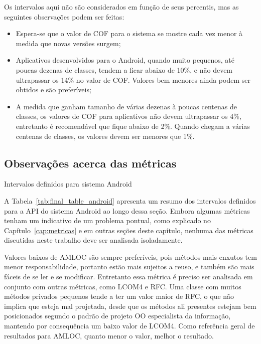 Os intervalos aqui não são considerados em função de seus percentis, mas as seguintes observações podem ser feitas:

\begin{itemize}
\item Espera-se que o valor de COF para o sistema se mostre cada vez menor à medida que novas versões surgem;
\item Aplicativos desenvolvidos para o Android, quando muito pequenos, até poucas dezenas de classes, tendem a ficar abaixo de 10\%, e não devem ultrapassar os 14\% no valor de COF. Valores bem menores ainda podem ser obtidos e são preferíveis;
\item A medida que ganham tamanho de várias dezenas à poucas centenas de classes, os valores de COF para aplicativos não devem ultrapassar os 4\%, entretanto é recomendável que fique abaixo de 2\%. Quando chegam a várias centenas de classes, os valores devem ser menores que 1\%.
\end{itemize}

\subsection{Observações acerca das métricas}

\begin{table}[!htb]
\centering
{}

\caption{Intervalos definidos para sistema Android}
\label{tab:final_table_android}
\end{table}

A Tabela~\ref{tab:final_table_android} apresenta um resumo dos intervalos definidos para a API do sistema Android ao longo dessa seção. Embora algumas métricas tenham um indicativo de um problema pontual, como explicado no Capítulo~\ref{cap:metricas} e em outras seções deste capítulo, nenhuma das métricas discutidas neste trabalho deve ser analisada isoladamente.

Valores baixos de AMLOC são sempre preferíveis, pois métodos mais enxutos tem menor responsabilidade, portanto estão mais sujeitos a reuso, e também são mais fáceis de se ler e se modificar. Entretanto essa métrica é preciso ser analisada em conjunto com outras métricas, como LCOM4 e RFC. Uma classe com muitos métodos privados pequenos tende a ter um valor maior de RFC, o que não implica que esteja mal projetada, desde que os métodos ali presentes estejam bem posicionados segundo o padrão de projeto OO especialista da informação, mantendo por consequência um baixo valor de LCOM4. Como referência geral de resultados para AMLOC, quanto menor o valor, melhor o resultado.

